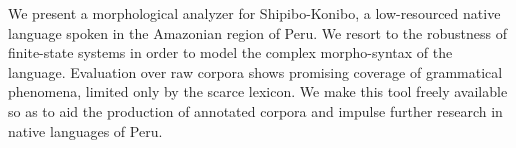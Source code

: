 We present a morphological analyzer for Shipibo-Konibo, a low-resourced native language spoken in the Amazonian region of Peru. We resort to the robustness of finite-state systems in order to model the complex morpho-syntax of the language. Evaluation over raw corpora shows promising coverage of grammatical phenomena, limited only by the scarce lexicon. We make this tool freely available so as to aid the production of annotated corpora and impulse further research in native languages of Peru.
